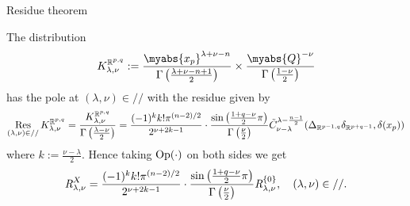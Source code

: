 \documentclass[pdf]{beamer}
\newcommand{\Op}{\mbox{\normalfont Op}}
\newcommand{\Res}{\operatorname{Res}\displaylimits}
\newcommand{\OpR}{\mbox{\it R}}
\theoremstyle{mystyle}
\theoremstyle{remark}
\begin{document}
\begin{frame}{Residue theorem}
	\begin{theorem}
		The distribution
		\[K_{\lambda,\nu}^{\mathbb{R}^{p,q}}:=\frac{\myabs{x_p}^{\lambda+\nu-n}}{\Gamma\left( \frac{\lambda+\nu-n+1}{2} \right)}\times
		\frac{\myabs{Q}^{-\nu}}{\Gamma\left( \frac{1-\nu}{2} \right)}\]
		has the pole at $(\lambda,\nu)\in//$ with the residue given by
		{\footnotesize
		\[\Res_{(\lambda,\nu)\in//}K_{\lambda,\nu}^{\mathbb{R}^{p,q}}=\frac{K_{\lambda,\nu}^{\mathbb{R}^{p,q}}}{\Gamma\left( \frac{\lambda-\nu}{2} \right)}
			=\frac{ (- 1)^k k!\pi^{(n - 2) / 2} 
		}{2^{ \nu + 2 k-1}}\cdot  \frac{\sin\left( \frac{1+q-\nu}{2}\pi \right)}{\Gamma\left( \frac{\nu}{2} \right)}
	\tilde{C}_{\nu - \lambda}^{\lambda - \frac{n
  	- 1}{2}} ({\Delta}_{\mathbb{R}^{p-1,q}} {\delta}_{\mathbb{R}^{p+q-1}}, \delta (x_p))
		\]
		}
		where $k:=\frac{\nu-\lambda}{2}$.
		Hence taking $\Op(\cdot)$ on both sides we get
  \[\OpR_{\lambda,\nu}^X  = \frac{ (- 1)^k k!\pi^{(n - 2) / 2} 
		}{2^{ \nu + 2 k-1}}\cdot  \frac{\sin\left( \frac{1+q-\nu}{2}\pi \right)}{\Gamma\left( \frac{\nu}{2} \right)}
     \OpR_{\lambda,\nu}^{ \left\{ 0 \right\} },\quad(\lambda,\nu)\in// . \]
	\end{theorem}
\end{frame}
\end{document}
